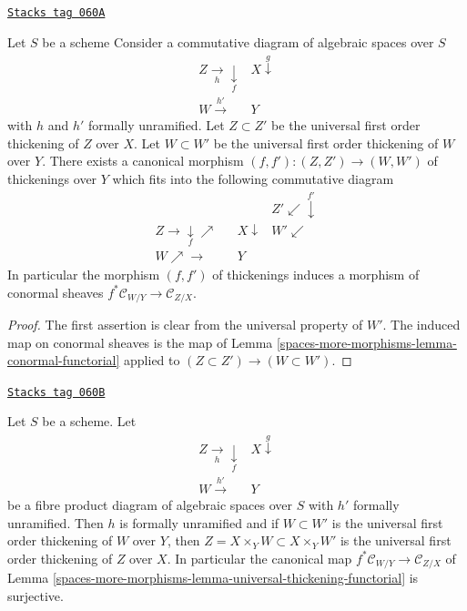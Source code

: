 \begin{lemma}
\label{spaces-more-morphisms-lemma-universal-thickening-functorial}
\href{https://stacks.math.columbia.edu/tag/060A}{\texttt{Stacks tag 060A}}

Let $S$ be a scheme
Consider a commutative diagram of algebraic spaces over $S$
$$
\begin{array}{cc}Z \underset{h}{\longrightarrow}\underset{f}{\downarrow} & X \overset{g}{\downarrow} \\ W \overset{h'}{\longrightarrow} & Y\end{array}
$$
with $h$ and $h'$ formally unramified. Let $Z \subset Z'$ be the universal
first order thickening of $Z$ over $X$. Let $W \subset W'$ be the universal
first order thickening of $W$ over $Y$. There exists a canonical morphism
$(f, f') : (Z, Z') \to (W, W')$ of thickenings over $Y$ which fits into
the following commutative diagram
$$
\begin{array}{cccc} &  &  & Z' \swarrow\overset{f'}{\downarrow} \\ Z \longrightarrow\underset{f}{\downarrow}\nearrow &  & X \downarrow & W' \swarrow \\ W \nearrow\longrightarrow &  & Y & \end{array}
$$
In particular the morphism $(f, f')$ of thickenings induces a morphism
of conormal sheaves $f^*\mathcal{C}_{W/Y} \to \mathcal{C}_{Z/X}$.
\end{lemma}

\begin{proof}
The first assertion is clear from the universal property of $W'$.
The induced map on conormal sheaves is the map of
Lemma \ref{spaces-more-morphisms-lemma-conormal-functorial}
applied to $(Z \subset Z') \to (W \subset W')$.
\end{proof}

\begin{lemma}
\label{spaces-more-morphisms-lemma-universal-thickening-fibre-product}
\href{https://stacks.math.columbia.edu/tag/060B}{\texttt{Stacks tag 060B}}

Let $S$ be a scheme. Let
$$
\begin{array}{cc}Z \underset{h}{\longrightarrow}\underset{f}{\downarrow} & X \overset{g}{\downarrow} \\ W \overset{h'}{\longrightarrow} & Y\end{array}
$$
be a fibre product diagram of algebraic spaces over $S$ with
$h'$ formally unramified. Then $h$ is formally unramified and if
$W \subset W'$ is the universal first order thickening of $W$ over $Y$,
then $Z = X \times_Y W \subset X \times_Y W'$ is the universal
first order thickening of $Z$ over $X$. In particular the canonical map
$f^*\mathcal{C}_{W/Y} \to \mathcal{C}_{Z/X}$ of
Lemma \ref{spaces-more-morphisms-lemma-universal-thickening-functorial}
is surjective.
\end{lemma}

